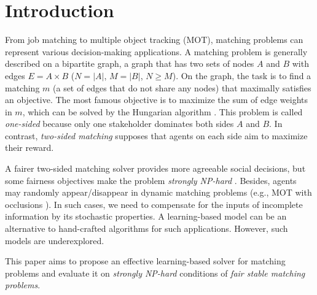 \section{Introduction}
From job matching to multiple object tracking (MOT),  matching problems can represent various decision-making applications.
A matching problem is generally described on a bipartite graph, a graph that has two sets of nodes $A$ and $B$ with edges $E=A\times B$ ($N=|A|$, $M=|B|$, $N\geq M$).
On the graph, the task is to find a matching $m$ (a set of edges that do not share any nodes) that maximally satisfies an objective.
The most famous objective is to maximize the sum of edge weights in $m$, which can be solved by the Hungarian algorithm \cite{kuhn1955hungarian}. This problem is called {\it one-sided} because only one stakeholder dominates both sides $A$ and $B$. In contrast, {\it two-sided matching} supposes that agents on each side aim to maximize their reward.

%

A fairer two-sided matching solver provides more agreeable social decisions, but some fairness objectives make the problem {\it strongly NP-hard} \cite{kato1993complexity,mcdermid2014sex}.
Besides, agents may randomly appear/disappear in dynamic matching problems (e.g., MOT with occlusions \cite{MOT_match}).
In such cases, we need to compensate for the inputs of incomplete information by its stochastic properties.
A learning-based model can be an alternative to hand-crafted algorithms for such applications.
However, such models are underexplored.

This paper aims to propose an effective learning-based solver for matching problems and evaluate it on {\it strongly NP-hard} conditions of {\it fair stable matching problems}.

